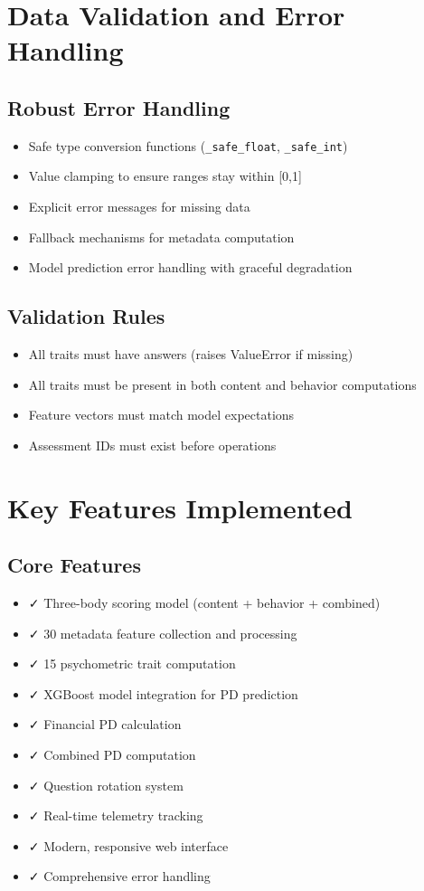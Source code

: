 \documentclass[11pt,a4paper]{article}
\begin{document}
\section{Data Validation and Error Handling}

\subsection{Robust Error Handling}
\begin{itemize}
    \item Safe type conversion functions (\texttt{\_safe\_float}, \texttt{\_safe\_int})
    \item Value clamping to ensure ranges stay within [0,1]
    \item Explicit error messages for missing data
    \item Fallback mechanisms for metadata computation
    \item Model prediction error handling with graceful degradation
\end{itemize}

\subsection{Validation Rules}
\begin{itemize}
    \item All traits must have answers (raises ValueError if missing)
    \item All traits must be present in both content and behavior computations
    \item Feature vectors must match model expectations
    \item Assessment IDs must exist before operations
\end{itemize}

\section{Key Features Implemented}

\subsection{Core Features}
\begin{itemize}
    \item ✓ Three-body scoring model (content + behavior + combined)
    \item ✓ 30 metadata feature collection and processing
    \item ✓ 15 psychometric trait computation
    \item ✓ XGBoost model integration for PD prediction
    \item ✓ Financial PD calculation
    \item ✓ Combined PD computation
    \item ✓ Question rotation system
    \item ✓ Real-time telemetry tracking
    \item ✓ Modern, responsive web interface
    \item ✓ Comprehensive error handling
\end{itemize}
\end{document}
